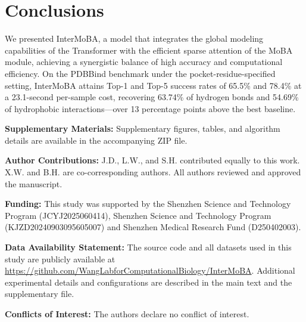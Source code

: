 \documentclass[11pt,a4paper]{article}
\theoremstyle{plain}
\theoremstyle{definition}
\begin{document}
\section{Conclusions}
We presented InterMoBA, a model that integrates the global modeling capabilities of the Transformer with the efficient sparse attention of the MoBA module, achieving a synergistic balance of high accuracy and computational efficiency. On the PDBBind benchmark under the pocket-residue-specified setting, InterMoBA attains Top-1 and Top-5 success rates of 65.5\% and 78.4\% at a 23.1-second per-sample cost, recovering 63.74\% of hydrogen bonds and 54.69\% of hydrophobic interactions---over 13 percentage points above the best baseline.

\vspace{0.5em}
{\small
\setlength{\parskip}{0.8em}
\noindent \textbf{Supplementary Materials:} Supplementary figures, tables, and algorithm details are available in the accompanying ZIP file.

\noindent \textbf{Author Contributions:} J.D., L.W., and S.H. contributed equally to this work. X.W. and B.H. are co-corresponding authors. All authors reviewed and approved the manuscript.

\noindent \textbf{Funding:} This study was supported by the Shenzhen Science and Technology Program (JCYJ2025060414), Shenzhen Science and Technology Program (KJZD20240903095605007) and Shenzhen Medical Research Fund (D250402003).

\noindent \textbf{Data Availability Statement:} The source code and all datasets used in this study are publicly available at \url{https://github.com/WangLabforComputationalBiology/InterMoBA}. Additional experimental details and configurations are described in the main text and the supplementary file.

\noindent \textbf{Conflicts of Interest:} The authors declare no conflict of interest.
\par}


\end{document}
